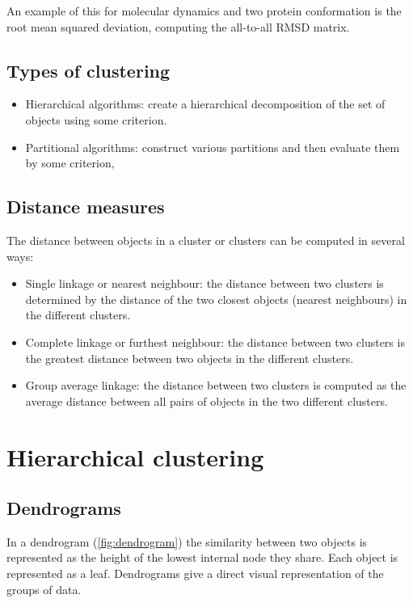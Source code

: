 	An example of this for molecular dynamics and two protein conformation is the root mean squared deviation, computing the all-to-all RMSD matrix.

	\subsection{Types of clustering}

	\begin{itemize}
		\item Hierarchical algorithms: create a hierarchical decomposition of the set of objects using some criterion.
		\item Partitional algorithms: construct various partitions and then evaluate them by some criterion,
	\end{itemize}

	\subsection{Distance measures}
	The distance between objects in a cluster or clusters can be computed in several ways:

	\begin{itemize}
		\item Single linkage or nearest neighbour: the distance between two clusters is determined by the distance of the two closest objects (nearest neighbours) in the different clusters.
		\item Complete linkage or furthest neighbour: the distance between two clusters is the greatest distance between two objects in the different clusters.
		\item Group average linkage: the distance between two clusters is computed as the average distance between all pairs of objects in the two different clusters.
	\end{itemize}

\section{Hierarchical clustering}

	\subsection{Dendrograms}
	In a dendrogram (\ref{fig:dendrogram}) the similarity between two objects is represented as the height of the lowest internal node they share.
	Each object is represented as a leaf.
	Dendrograms give a direct visual representation of the groups of data.

